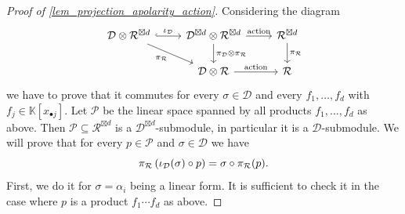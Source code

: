 \documentclass[a4paper,11pt,reqno]{amsart}
\newcommand{\calD}{\mathcal{D}}
\newcommand{\calP}{\mathcal{P}}
\newcommand{\calR}{\mathcal{R}}
\newcommand{\bbK}{\mathbb{K}}
\numberwithin{equation}{section}
\theoremstyle{definition}
\theoremstyle{plain}
\theoremstyle{remark}
\begin{document}
\begin{proof}[Proof of \autoref{lem_projection_apolarity_action}]
\def\polyspace{\calP}
Considering the diagram
\[
\begin{tikzcd}
\calD\otimes\calR^{\boxtimes d}\ar[r,hook,"\injD"]\ar[dr,"\projR"']&\calD^{\boxtimes d}\otimes\calR^{\boxtimes d}\ar[r,"\mathrm{action}"]\ar[d,"\projD\otimes\projR"]&\calR^{\boxtimes d}\ar[d,"\projR"]\\
&\calD\otimes\calR\ar[r, "\mathrm{action}"] &\calR
\end{tikzcd}
\]
we have to prove that it commutes for every $\sigma\in\calD$ and every
$f_1,\dots,f_d$ with $f_j\in \bbK[x_{\bullet j}]$.
Let $\polyspace$ be the linear space spanned by all products $f_1, \ldots
,f_d$ as above. Then $\polyspace \subseteq \calR^{\boxtimes d}$ is a
$\calD^{\boxtimes d}$-submodule, in particular it is a $\calD$-submodule.
We will prove that for every $p\in \polyspace$ and $\sigma\in \calD$ we have
\begin{equation}\label{eq:compatibility}
    \projR\left(\injD(\sigma)\circ p\right)=\sigma \circ \projR(p).
\end{equation}
First, we do it for $\sigma = \alpha_{i}$ being a linear form. It is sufficient to check it {in the case where}
$p$ is a product {$f_1\cdots  f_d$} as above.



\end{proof}
\end{document}
